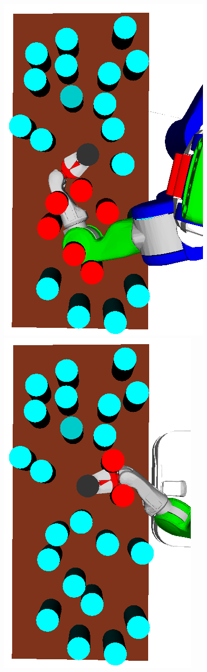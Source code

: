 \begin{figure}[t]
  \centering
    \noindent
    \includegraphics[scale=0.17, angle=270]{images/grasp_teaser_bad.png}
    \includegraphics[scale=0.17, angle=270]{images/grasp_teaser_good.png}

\end{figure}
